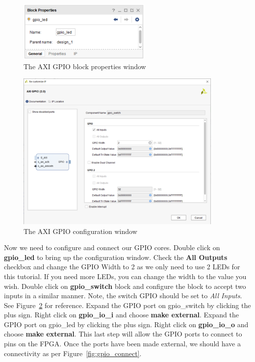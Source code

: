\documentclass[11pt]{article}
\begin{document}
\begin{figure}[h]
    \centering
    \includegraphics[width=0.58\textwidth]{images/gpio_prop.png}
    \caption{The AXI GPIO block properties window}
    \label{fig:gpio_prop}
\end{figure}

\begin{figure}[!b]
    \centering
    \includegraphics[width=0.9\textwidth]{images/gpio_config.png}
    \caption{The AXI GPIO configuration window}
    \label{fig:gpio_config}
\end{figure}

Now we need to configure and connect our GPIO cores. Double click on \textbf{gpio\_led} to bring up the configuration window. Check the \textbf{All Outputs} checkbox and change the GPIO Width to 2 as we only need to use 2 LEDs for this tutorial. If you need more LEDs, you can change the width to the value you wish. Double click on \textbf{gpio\_switch} block and configure the block to accept two inputs in a similar manner. Note, the switch GPIO should be set to \textit{All Inputs}. See Figure~\ref{fig:gpio_config} for reference. Expand the GPIO port on gpio\_switch by clicking the plus sign. Right click on \textbf{gpio\_io\_i} and choose \textbf{make external}. Expand the GPIO port on gpio\_led by clicking the plus sign. Right click on \textbf{gpio\_io\_o} and choose \textbf{make external}. This last step will allow the GPIO ports to connect to pins on the FPGA. Once the ports have been made external, we should have a connectivity as per Figure~\ref{fig:gpio_connect}.
\end{document}
